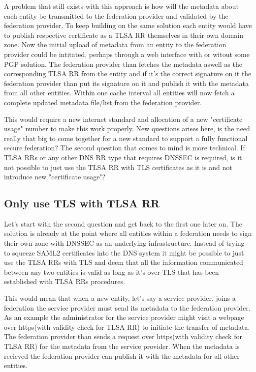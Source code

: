 A problem that still exists with this approach is how will the metadata about each entity be transmitted to the federation provider and validated by the federation provider.
To keep building on the same solution each entity would have to publish respective certificate as a TLSA RR themselves in their own domain zone.
Now the initial upload of metadata from an entity to the federation provider could be intitated, perhaps through a web interface with or witout some PGP solution.
The federation provider than fetches the metadata aswell as the corresponding TLSA RR from the entity and if it's the correct signature on it the federation provider than put its signature on it and publish it with the metadata from all other entities.
Within one cache interval all entities will now fetch a complete updated metadata file/list from the federation provider.


This would require a new internet standard and allocation of a new "certificate usage" number to make this work properly.
New questions arises here, is the need really that big to come together for a new standard to support a fully functional secure federation?
The second question that comes to mind is more technical.
If TLSA RRs or any other DNS RR type that requires DNSSEC is required, is it not possible to just use the TLSA RR with TLS certificates as it is and not introduce new "certificate usage"?

\subsection{Only use TLS with TLSA RR}
\label{subsec:only-tlsa-rr-with-tls}
Let's start with the second question and get back to the first one later on.
The solution is already at the point where all entities within a federation needs to sign their own zone with DNSSEC as an underlying infrastructure.
Instead of trying to squeeze SAML2 certificates into the DNS system it might be possible to just use the TLSA RRs with TLS and deem that all the information communicated between any two entities is valid as long as it's over TLS that has been established with TLSA RRs procedures.

This would mean that when a new entity, let's say a service provider, joins a federation the service provider must send its metadata to the federation provider.
As an example the administrator for the service provider might visit a webpage over https(with validity check for TLSA RR) to initiate the transfer of metadata.
The federation provider than sends a request over https(with validity check for TLSA RR) for the metadata from the service provider.
When the metadata is recieved the federation provider can publish it with the metadata for all other entities.

